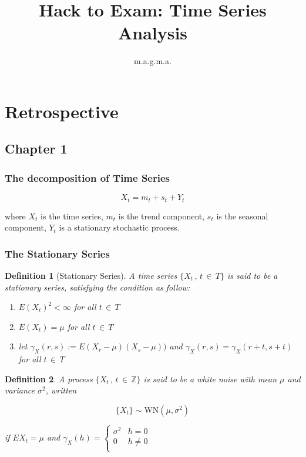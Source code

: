\documentclass{article}
\title{Hack to Exam: Time Series Analysis}
\author{m.a.g.m.a.}
\date{}
\newtheorem{Definition}{Definition}
\begin{document}
    
            \maketitle

        \section{Retrospective}

        \subsection{Chapter 1}

        \subsubsection{The decomposition of Time Series}

            $$X_t = m_t + s_t + Y_t$$

            where $X_t$ is the time series, 
            $m_t$ is the trend component, 
            $s_t$ is the seasonal component, 
            $Y_t$ is a stationary stochastic process.

        \subsubsection{The Stationary Series}

            \begin{Definition}[Stationary Series]
                A time series $\{X_t \,,\, t \,\in\, T\}$ is 
            said to be a stationary series, satisfying the 
            condition as follow:
                \begin{enumerate}
                    \item $E(X_t)^2 < \infty$ for all $t \,\in\, T$
                    \item $E(X_t) = \mu$ for all $t \,\in\, T$
                    \item let $\gamma_X(r,s) := E(X_r - \mu)(X_s -\mu))$ 
                    and $\gamma_X(r,s) = \gamma_X(r+t,s+t)$ for all $t \,\in\, T$
                \end{enumerate}
                
            \end{Definition}

            \begin{Definition}
                A process $\{X_t\,,\,t \,\in\, \mathbb{Z} \}$ 
                is said to be a white noise with mean $\mu$
                and variance $\sigma^2$, written

                $$ \{X_t\} \sim \text{WN}(\mu,\sigma^2) $$

                if $EX_t = \mu$ and $\gamma_X(h) = \begin{cases} 
                        \sigma^2   &h   =  0   \\
                        0          &h \neq 0   \\                         
                \end{cases}$

            \end{Definition}
\end{document}
